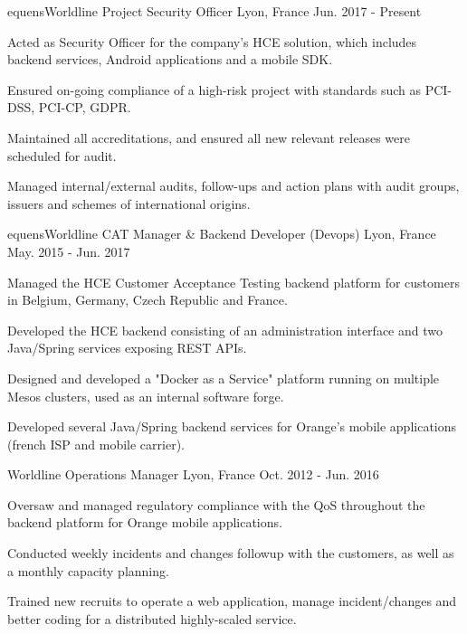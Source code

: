 \begin{cventries}
  \cventry
    {equensWorldline}
    {Project Security Officer}
    {Lyon, France}
    {Jun. 2017 - Present}
    {
      \begin{cvitems}
        \item {Acted as Security Officer for the company's HCE solution, which includes backend services, Android applications and a mobile SDK.}
        \item {Ensured on-going compliance of a high-risk project with standards such as PCI-DSS, PCI-CP, GDPR.}
        \item {Maintained all accreditations, and ensured all new relevant releases were scheduled for audit.}
        \item {Managed internal/external audits, follow-ups and action plans with audit groups, issuers and schemes of international origins.}
      \end{cvitems}
    }
  \cventry
    {equensWorldline}
    {CAT Manager \& Backend Developer (Devops)}
    {Lyon, France}
    {May. 2015 - Jun. 2017}
    {
      \begin{cvitems}
        \item {Managed the HCE Customer Acceptance Testing backend platform for customers in Belgium, Germany, Czech Republic and France.}
        \item {Developed the HCE backend consisting of an administration interface and two Java/Spring services exposing REST APIs.}
        \item {Designed and developed a "Docker as a Service" platform running on multiple Mesos clusters, used as an internal software forge.}
        \item {Developed several Java/Spring backend services for Orange's mobile applications (french ISP and mobile carrier).}
      \end{cvitems}
    }
  \cventry
    {Worldline}
    {Operations Manager}
    {Lyon, France}
    {Oct. 2012 - Jun. 2016}
    {
      \begin{cvitems}
        \item {Oversaw and managed regulatory compliance with the QoS throughout the backend platform for Orange mobile applications.}
        \item {Conducted weekly incidents and changes followup with the customers, as well as a monthly capacity planning.}
        \item {Trained new recruits to operate a web application, manage incident/changes and better coding for a distributed highly-scaled service.}

\end{cvitems}}
\end{cventries}
